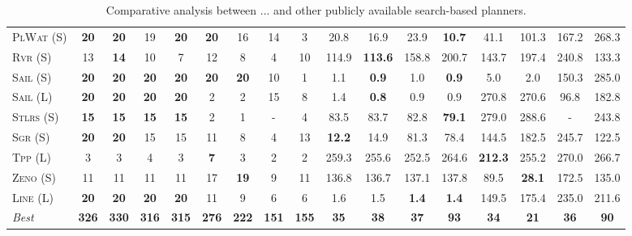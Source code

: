 \begin{table}[tb]
{\begin{tabular}{|l||cccccccc||cccccccc||}
\textsc{PlWat} (S)&\textbf{20}&\textbf{20}&19&\textbf{20}&\textbf{20}&16&14&3&20.8&16.9&23.9&\textbf{10.7}&41.1&101.3&167.2&268.3\\
\textsc{Rvr} (S)&13&\textbf{14}&10&7&12&8&4&10&114.9&\textbf{113.6}&158.8&200.7&143.7&197.4&240.8&133.3\\
\textsc{Sail} (S)&\textbf{20}&\textbf{20}&\textbf{20}&\textbf{20}&\textbf{20}&\textbf{20}&10&1&1.1&\textbf{0.9}&1.0&\textbf{0.9}&5.0&2.0&150.3&285.0\\
\textsc{Sail} (L)&\textbf{20}&\textbf{20}&\textbf{20}&\textbf{20}&2&2&15&8&1.4&\textbf{0.8}&0.9&0.9&270.8&270.6&96.8&182.8\\
\textsc{Stlrs} (S)&\textbf{15}&\textbf{15}&\textbf{15}&\textbf{15}&2&1&-&4&83.5&83.7&82.8&\textbf{79.1}&279.0&288.6&-&243.8\\
\textsc{Sgr} (S)&\textbf{20}&\textbf{20}&15&15&11&8&4&13&\textbf{12.2}&14.9&81.3&78.4&144.5&182.5&245.7&122.5\\
\textsc{Tpp} (L)&3&3&4&3&\textbf{7}&3&2&2&259.3&255.6&252.5&264.6&\textbf{212.3}&255.2&270.0&266.7\\
\textsc{Zeno} (S)&11&11&11&11&17&\textbf{19}&9&11&136.8&136.7&137.1&137.8&89.5&\textbf{28.1}&172.5&135.0\\
\textsc{Line} (L)&\textbf{20}&\textbf{20}&\textbf{20}&\textbf{20}&11&9&6&6&1.6&1.5&\textbf{1.4}&\textbf{1.4}&149.5&175.4&235.0&211.6
\\\hline
\textit{Best}&\textbf{326}&\textbf{330}&\textbf{316}&\textbf{315}&\textbf{276}&\textbf{222}&\textbf{151}&\textbf{155}&\textbf{35}&\textbf{38}&\textbf{37}&\textbf{93}&\textbf{34}&\textbf{21}&\textbf{36}&\textbf{90}\\\hline

        \end{tabular}}
        \caption{Comparative analysis between ... and other publicly available search-based planners.}
        \label{tab:search}
        \end{table}
        